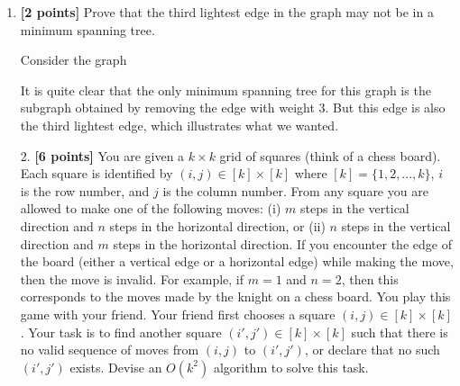 \documentclass{assignment-263}
\begin{document}
\begin{enumerate}
\begin{enumerate}
      \item \textbf{[2 points]} Prove that the third lightest edge in the graph may not be in a minimum spanning tree.
      
      Consider the graph
      \begin{center}
        \centering
      \end{center}
      It is quite clear that the only minimum spanning tree for this graph is the subgraph obtained by removing the edge with weight 3. But this edge is also the third lightest edge, which illustrates what we wanted.
    \end{enumerate}

	\end{enumerate}

  \begin{enumerate}
    \item[2.] \textbf{[6 points]}
    You are given a $k \times k$ grid of squares (think of a chess board). Each square is identified by $(i,j) \in [k] \times [k]$ where $[k] = \{1,2,...,k\}$, $i$ is the row number, and $j$ is the column number. From any square you are allowed to make one of the following moves: (i) $m$ steps in the vertical direction and $n$ steps in the horizontal direction, or (ii) $n$ steps in the vertical direction and $m$ steps in the horizontal direction. If you encounter the edge of the board (either a vertical edge or a horizontal edge) while making the move, then the move is invalid. For example, if $m = 1$ and $n = 2$, then this corresponds to the moves made by the knight on a chess board. You play this game with your friend. Your friend first chooses a square $(i,j) \in [k]\times [k]$. Your task is to find another square $(i',j') \in [k] \times [k]$ such that there is no valid sequence of moves from $(i,j)$ to $(i',j')$, or declare that no such $(i',j')$ exists. Devise an $O(k^2)$ algorithm to solve this task.
 \end{enumerate}
\end{document}
